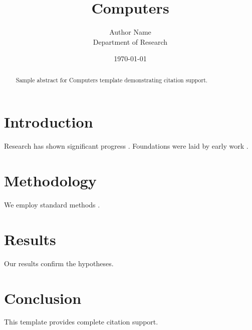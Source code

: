 \documentclass{mdpi}
\title{Computers}
\author{Author Name \\ \small Department of Research}
\date{\today}
\begin{document}
\maketitle

\begin{abstract}
Sample abstract for Computers template demonstrating citation support.
\end{abstract}

\section{Introduction}
Research has shown significant progress \citep{einstein1905}. Foundations were laid by early work \citep{turing1950}.

\section{Methodology}
We employ standard methods \citep{knuth1984}.

\section{Results}
Our results confirm the hypotheses.

\section{Conclusion}
This template provides complete citation support.



\end{document}
